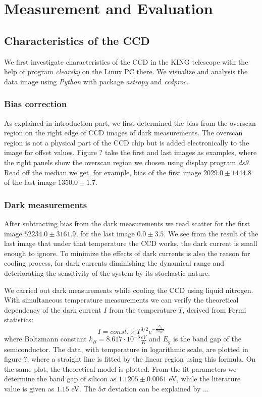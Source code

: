 \section{Measurement and Evaluation}
\subsection{Characteristics of the CCD}
We first investigate characteristics of the CCD in the KING telescope with the help of program \textit{clearsky} on the Linux PC there. We visualize and analysis the data image using \textit{Python} with package \textit{astropy} and \textit{ccdproc}.
\subsubsection{Bias correction}
As explained in introduction part, we first determined the bias from the overscan region on the right edge of CCD images of dark measurements. The overscan region is not a physical part of the CCD chip but is added electronically to the image for offset values. Figure ? take the first and last images as examples, where the right panels show the overscan region we chosen using display program \textit{ds9}. Read off the median we get, for example, bias of the first image $2029.0 \pm 1444.8$  of the last image $1350.0 \pm 1.7$. 

\subsubsection{Dark measurements}
After subtracting bias from the dark measurements we read scatter for the first image $52234.0\pm 3161.9$, for the last image $0.0 \pm 3.5$. We see from the result of the last image that under that temperature the CCD works, the dark current is small enough to ignore. To minimize the effects of dark currents is also the reason for cooling process, for dark currents diminishing the dynamical range and deteriorating the sensitivity of the system by its stochastic nature. 

We carried out dark measurements while cooling the CCD using liquid nitrogen. With simultaneous temperature measurements we can verify the theoretical dependency of the dark current $I$ from the temperature $T$, derived from Fermi statistics: 
\begin{equation}
\label{Flux}
	I = const.\times T^{3/2} e^{-\frac{E_g}{2k_BT}}
\end{equation}
where Boltzmann constant $k_B = 8.617 \cdot 10^{-5} \frac{eV}{K}$ and $E_g$ is the band gap of the semiconductor. The data, with temperature in logarithmic scale, are plotted in figure ?, where a straight line is fitted by the linear region using this formula. On the same plot, the theoretical model is plotted. From the fit parameters we determine the band gap of silicon as $1.1205 \pm 0.0061$ eV, while the literature value is given as $1.15$ eV. The $5\sigma$ deviation can be explained by ...

